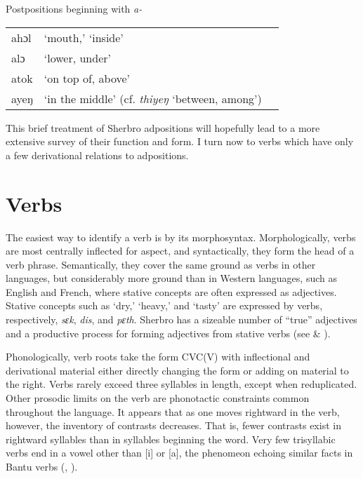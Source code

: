 \newpage
\ea%
    \label{ex:90}
Postpositions beginning with \textit{a-}\\

\begin{tabular}[t]{lll}
ahɔl & ‘mouth,' ‘inside'\\

alɔ & ‘lower, under'\\

atok & ‘on top of, above'\\

ayeŋ & ‘in the middle' (cf. \textit{thiyeŋ} ‘between, among')
\end{tabular}
\z

This brief treatment of Sherbro adpositions will hopefully lead to a more extensive survey of their function and form. I turn now to verbs which have only a few derivational relations to adpositions.

\section{Verbs}
\label{sec:3.9}\hypertarget{Toc115517773}{}
The easiest way to identify a verb is by its morphosyntax. Morphologically, verbs are most centrally inflected for aspect, and syntactically, they form the head of a verb phrase. Semantically, they cover the same ground as verbs in other languages, but considerably more ground than in Western languages, such as English and French, where stative concepts are often expressed as adjectives. Stative concepts such as ‘dry,' ‘heavy,' and ‘tasty' are expressed by verbs, respectively, \textit{sɛk}, \textit{dis}, and \textit{pɛth}. Sherbro has a sizeable number of “true” adjectives and a productive process for forming adjectives from stative verbs (see  \& ).

Phonologically, verb roots take the form CVC(V) with inflectional and derivational material either directly changing the form or adding on material to the right. Verbs rarely exceed three syllables in length, except when reduplicated. Other prosodic limits on the verb are phonotactic constraints common throughout the language. It appears that as one moves rightward in the verb, however, the inventory of contrasts decreases. That is, fewer contrasts exist in rightward syllables than in syllables beginning the word. Very few trisyllabic verbs end in a vowel other than [i] or [a], the phenomeon echoing similar facts in Bantu verbs (\citealt{Hyman1993},  \citealt{Hyman2004}).

